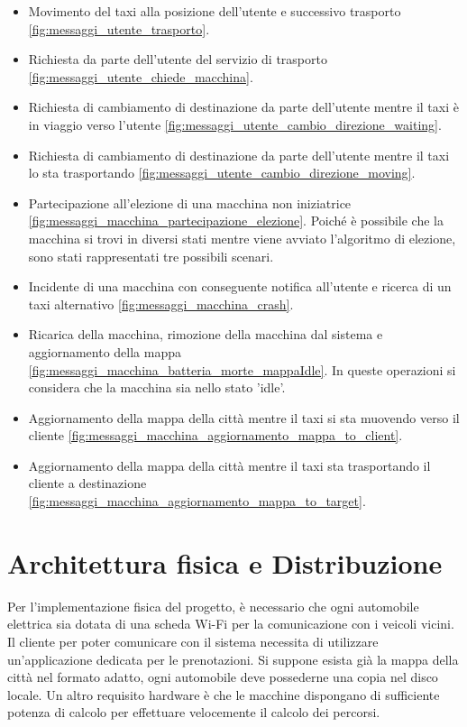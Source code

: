 \begin{itemize}
	\item Movimento del taxi alla posizione dell'utente e successivo trasporto \ref{fig:messaggi_utente_trasporto}.
	\item Richiesta da parte dell'utente del servizio di trasporto \ref{fig:messaggi_utente_chiede_macchina}.
	\item Richiesta di cambiamento di destinazione da parte dell'utente mentre il taxi è in viaggio verso l'utente \ref{fig:messaggi_utente_cambio_direzione_waiting}.
	\item Richiesta di cambiamento di destinazione da parte dell'utente mentre il taxi lo sta trasportando \ref{fig:messaggi_utente_cambio_direzione_moving}.
	\item Partecipazione all'elezione di una macchina non iniziatrice \ref{fig:messaggi_macchina_partecipazione_elezione}. Poiché è possibile che la macchina si trovi in diversi stati mentre viene avviato l'algoritmo di elezione, sono stati rappresentati tre possibili scenari.
	\item Incidente di una macchina con conseguente notifica all'utente e ricerca di un taxi alternativo \ref{fig:messaggi_macchina_crash}.
	\item Ricarica della macchina, rimozione della macchina dal sistema e aggiornamento della mappa  \ref{fig:messaggi_macchina_batteria_morte_mappaIdle}. In queste operazioni si considera che la macchina sia nello stato 'idle'.
	\item Aggiornamento della mappa della città mentre il taxi si sta muovendo verso il cliente \ref{fig:messaggi_macchina_aggiornamento_mappa_to_client}.
	\item Aggiornamento della mappa della città mentre il taxi sta trasportando il cliente a destinazione \ref{fig:messaggi_macchina_aggiornamento_mappa_to_target}.
\end{itemize}


\section{Architettura fisica e Distribuzione}
Per l'implementazione fisica del progetto, è necessario che ogni automobile elettrica sia dotata di una scheda Wi-Fi per la comunicazione con i veicoli vicini. Il cliente per poter comunicare con il sistema necessita di utilizzare un'applicazione dedicata per le prenotazioni. Si suppone esista già la mappa della città nel formato adatto, ogni automobile deve possederne una copia nel disco locale. Un altro requisito hardware è che le macchine dispongano di sufficiente potenza di calcolo per effettuare velocemente il calcolo dei percorsi.

